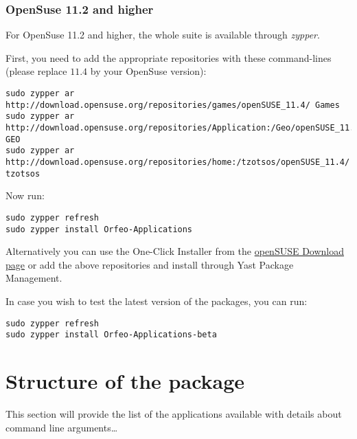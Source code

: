 \subsubsection{OpenSuse 11.2 and higher}
\label{ssec:opensuse_binaries}

For OpenSuse 11.2 and higher, the whole \otb suite is available
through \emph{zypper}.

First, you need to add the appropriate repositories with these
command-lines (please replace $11.4$ by your OpenSuse version):
\begin{verbatim}
sudo zypper ar 
http://download.opensuse.org/repositories/games/openSUSE_11.4/ Games
sudo zypper ar 
http://download.opensuse.org/repositories/Application:/Geo/openSUSE_11.4/ GEO
sudo zypper ar 
http://download.opensuse.org/repositories/home:/tzotsos/openSUSE_11.4/ tzotsos
\end{verbatim}

Now run:
\begin{verbatim}
sudo zypper refresh
sudo zypper install Orfeo-Applications
\end{verbatim}

Alternatively you can use the One-Click Installer from the
\href{http://software.opensuse.org/search?q=Orfeo&baseproject=openSUSE\%3A11.4&lang=en&include_home=true&exclude_debug=true}{openSUSE
  Download page} or add the above repositories and install through
Yast Package Management.

In case you wish to test the latest version of the packages, you can run:
\begin{verbatim}
sudo zypper refresh
sudo zypper install Orfeo-Applications-beta
\end{verbatim}

\section{Structure of the package}\label{sec:appstruct}
This section will provide the list of the applications available with details about command line arguments\dots
